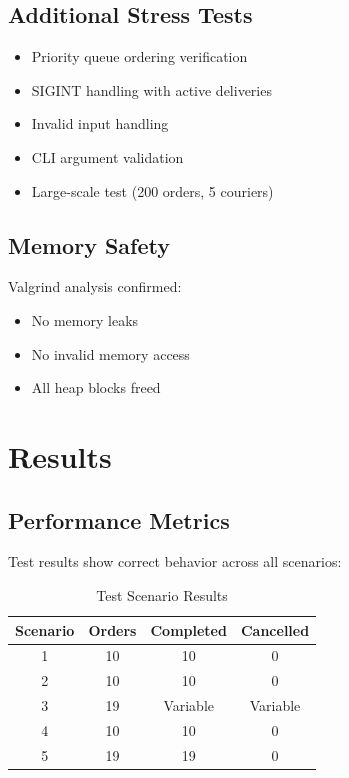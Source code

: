 \documentclass[12pt,a4paper]{article}
\begin{document}
\subsection{Additional Stress Tests}

\begin{itemize}
    \item Priority queue ordering verification
    \item SIGINT handling with active deliveries
    \item Invalid input handling
    \item CLI argument validation
    \item Large-scale test (200 orders, 5 couriers)
\end{itemize}

\subsection{Memory Safety}

Valgrind analysis confirmed:
\begin{itemize}
    \item No memory leaks
    \item No invalid memory access
    \item All heap blocks freed
\end{itemize}

\section{Results}

\subsection{Performance Metrics}

Test results show correct behavior across all scenarios:

\begin{table}[H]
\centering
\begin{tabular}{|c|c|c|c|}
\hline
Scenario & Orders & Completed & Cancelled \\
\hline
1 & 10 & 10 & 0 \\
2 & 10 & 10 & 0 \\
3 & 19 & Variable & Variable \\
4 & 10 & 10 & 0 \\
5 & 19 & 19 & 0 \\
\hline
\end{tabular}
\caption{Test Scenario Results}
\end{table}
\end{document}
